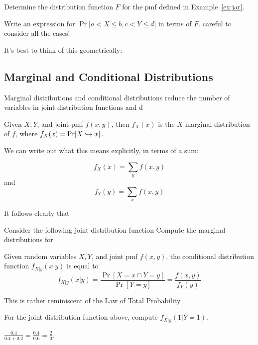 \documentclass[../main.tex]{subfiles}
\begin{document}
\begin{example}
Determine the distribution function $F$ for the pmf defined in Example~\ref{ex:jar}. 
\end{example}
\begin{solution}
\end{solution}
\begin{example}
Write an expression for $\Pr[a<X\leq b, c< Y \leq d$] in terms of $F$. %
careful to consider all the cases!
\end{example}
\begin{solution}
It's best to think of this geometrically: 
\end{solution}

\subsection{Marginal and Conditional Distributions}
Marginal distributions and conditional distributions reduce the number of variables in joint distribution functions and d

\begin{definition}
Given $X, Y$, and joint pmf $f(x,y)$, then $f_X(x)$ is the $X$-marginal distribution of $f$, where $f_X(x) = \mathrm{Pr}[X \hookrightarrow x]$. 
\end{definition}
We can write out what this means explicitly, in terms of a sum:
\begin{theorem}
\[
    f_X(x) = \sum_y f(x,y)
\]
and 
\[
    f_Y(y) = \sum_x f(x,y)
\]
\end{theorem}
It follows clearly that 
\begin{example}
Consider the following joint distribution function
Compute the marginal distributions for 
\end{example}

\begin{definition}
Given random variables $X,Y$, and joint pmf $f(x,y)$, the conditional distribution function $f_{X|y}(x|y)$ is equal to 
\[
    f_{X|y}(x|y) = \frac{\Pr[X=x \cap Y=y]}{\Pr[Y=y]} = \frac{f(x,y)}{f_Y(y)}
\]
\end{definition}
This is rather reminiscent of the Law of Total Probability 

\begin{example}
For the joint distribution function above, compute $f_{X|y}(1|Y=1)$.
\end{example}
\begin{solution}[Answer.]
$\frac{0.4}{0.4 + 0.2} = \frac{0.4}{0.6} = \frac{2}{3}$.
\end{solution}
\end{document}
